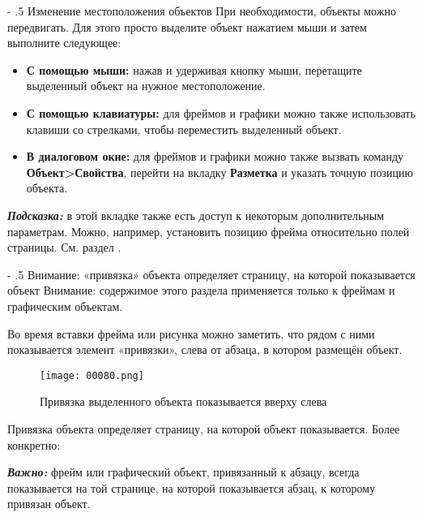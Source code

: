 ﻿\documentclass[a4paper,10pt]{article}
\makeatletter
\renewcommand\paragraph{%
   \@startsection{paragraph}{4}{0mm}%
      {-\baselineskip}%
      {.5\baselineskip}%
      {\normalfont\normalsize\bfseries}}
\makeatother
\begin{document}
\paragraph{Изменение местоположения объектов}
При необходимости, объекты можно передвигать. Для этого просто выделите объект нажатием мыши и затем выполните следующее:
\begin{itemize}
 \item \textbf{С помощью мыши:} нажав и удерживая кнопку мыши, перетащите выделенный объект на нужное местоположение.
 \item \textbf{С помощью клавиатуры:} для фреймов и графики можно также использовать клавиши со стрелками, чтобы переместить выделенный объект.
 \item \textbf{В диалоговом окне:} для фреймов и графики можно также вызвать команду \textbf{Объект>Свойства}, перейти на вкладку \textbf{Разметка} и указать точную позицию объекта.
\end{itemize}

\textbf{\textit{Подсказка:}} в этой вкладке также есть доступ к некоторым дополнительным параметрам. Можно, например, установить позицию фрейма относительно полей страницы. См. раздел .

\paragraph{Внимание: «привязка» объекта определяет страницу, на которой показывается объект}
Внимание: содержимое этого раздела применяется только к фреймам и графическим объектам.

Во время вставки фрейма или рисунка можно заметить, что рядом с ними показывается элемент «привязки», слева от абзаца, в котором размещён объект.

\begin{figure}[ht]
\texttt{[image: 00080.png]}
\centering
\caption{Привязка выделенного объекта показывается вверху слева}
\end{figure}

Привязка объекта определяет страницу, на которой объект показывается. Более конкретно:

\begin{mdframed}[backgroundcolor=blue!10]
\textbf{\textit{Важно:}} фрейм или графический объект, привязанный к абзацу, всегда показывается на той странице, на которой показывается абзац, к которому привязан объект.
\end{mdframed}
\end{document}
